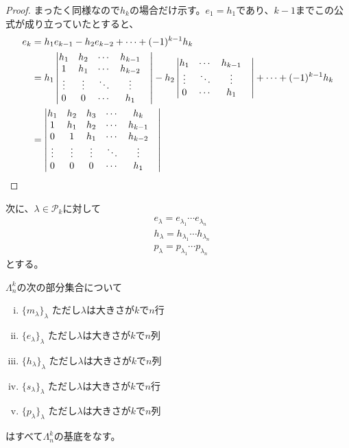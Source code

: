 \documentclass{ltjsreport}
\begin{document}
\begin{proof}
  まったく同様なので$h_k$の場合だけ示す。$e_1=h_1$であり、$k-1$までこの公式が成り立っていたとすると、
  \begin{align*}
    e_k&=h_1e_{k-1}-h_2e_{k-2}+\cdots+(-1)^{k-1}h_k \\
    &=h_1\begin{vmatrix} 
      h_1&h_2&\cdots&h_{k-1}\\
      1&h_1&\cdots&h_{k-2}\\
      \vdots&\vdots&\ddots&\vdots&\\
      0&0&\cdots&h_1
     \end{vmatrix}-h_2\begin{vmatrix} 
      h_1&\cdots&h_{k-1}\\
      \vdots&\ddots&\vdots&\\
      0&\cdots&h_1
     \end{vmatrix}+\cdots+(-1)^{k-1}h_k\\
    &=\begin{vmatrix} 
      h_1&h_2&h_3&\cdots&h_k\\
      1&h_1&h_2&\cdots&h_{k-1}\\
      0&1&h_1&\cdots&h_{k-2}\\
      \vdots&\vdots&\vdots&\ddots&\vdots&\\
      0&0&0&\cdots&h_1
     \end{vmatrix}
  \end{align*}
\end{proof}

次に、$\lambda\in\mathcal{P}_k$に対して
\begin{align*}
  &e_\lambda=e_{\lambda_1}\cdots e_{\lambda_n}\\
  &h_\lambda=h_{\lambda_1}\cdots h_{\lambda_n}\\
  &p_\lambda=p_{\lambda_1}\cdots p_{\lambda_n}
\end{align*}
とする。

\begin{prop}\label{various_basis}
  $\Lambda^k_n$の次の部分集合について
  \begin{enumerate}[(i)]
    \item $\{m_\lambda\}_\lambda$ ただし$\lambda$は大きさが$k$で$n$行
    \item $\{e_\lambda\}_\lambda$ ただし$\lambda$は大きさが$k$で$n$列
    \item $\{h_\lambda\}_\lambda$ ただし$\lambda$は大きさが$k$で$n$列
    \item $\{s_\lambda\}_\lambda$ ただし$\lambda$は大きさが$k$で$n$行
    \item $\{p_\lambda\}_\lambda$ ただし$\lambda$は大きさが$k$で$n$列
  \end{enumerate}
  はすべて$\Lambda^k_n$の基底をなす。
\end{prop}
\end{document}
